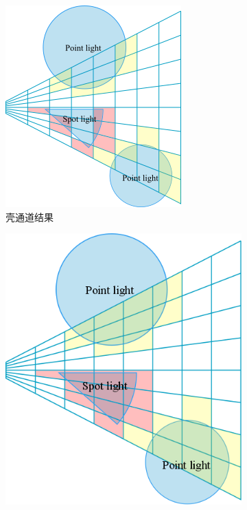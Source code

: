 \begin{figure}
\begin{center}
	\begin{subfigure}[b]{0.49\textwidth}
		\includegraphics[width=1.\textwidth]{figures/shade/fill-pass-1}
		\caption{壳通道结果}
	\end{subfigure}
	\begin{subfigure}[b]{0.49\textwidth}
		\includegraphics[width=1.\textwidth]{figures/shade/fill-pass-2}

\end{subfigure}
\end{center}
\end{figure}

